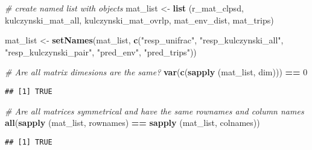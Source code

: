 \documentclass[]{article}
\newenvironment{Shaded}{\begin{snugshade}}{\end{snugshade}}
\newcommand{\KeywordTok}[1]{\textcolor[rgb]{0.13,0.29,0.53}{\textbf{#1}}}
\newcommand{\DataTypeTok}[1]{\textcolor[rgb]{0.13,0.29,0.53}{#1}}
\newcommand{\DecValTok}[1]{\textcolor[rgb]{0.00,0.00,0.81}{#1}}
\newcommand{\StringTok}[1]{\textcolor[rgb]{0.31,0.60,0.02}{#1}}
\newcommand{\CommentTok}[1]{\textcolor[rgb]{0.56,0.35,0.01}{\textit{#1}}}
\newcommand{\ControlFlowTok}[1]{\textcolor[rgb]{0.13,0.29,0.53}{\textbf{#1}}}
\newcommand{\OperatorTok}[1]{\textcolor[rgb]{0.81,0.36,0.00}{\textbf{#1}}}
\newcommand{\NormalTok}[1]{#1}
\begin{document}
\begin{Shaded}
\begin{Highlighting}[]
\CommentTok{# create named list with objects}
\NormalTok{mat_list <-}\StringTok{ }\KeywordTok{list}\NormalTok{ (r_mat_clpsd, kulczynski_mat_all, kulczynski_mat_ovrlp, }
\NormalTok{                   mat_env_dist, mat_trips) }

\NormalTok{mat_list <-}\StringTok{ }\KeywordTok{setNames}\NormalTok{(mat_list, }\KeywordTok{c}\NormalTok{(}\StringTok{"resp_unifrac"}\NormalTok{, }\StringTok{"resp_kulczynski_all"}\NormalTok{, }\StringTok{"resp_kulczynski_pair"}\NormalTok{, }
                     \StringTok{"pred_env"}\NormalTok{, }\StringTok{"pred_trips"}\NormalTok{))}

\CommentTok{# Are all matrix dimesions are the same?}
\KeywordTok{var}\NormalTok{(}\KeywordTok{c}\NormalTok{(}\KeywordTok{sapply}\NormalTok{ (mat_list, dim))) }\OperatorTok{==}\StringTok{ }\DecValTok{0}
\end{Highlighting}
\end{Shaded}

\begin{verbatim}
## [1] TRUE
\end{verbatim}

\begin{Shaded}
\begin{Highlighting}[]
\CommentTok{# Are all matrices symmetrical and have the same rownames and column names}
\KeywordTok{all}\NormalTok{(}\KeywordTok{sapply}\NormalTok{ (mat_list, rownames) }\OperatorTok{==}\StringTok{ }\KeywordTok{sapply}\NormalTok{ (mat_list, colnames))}
\end{Highlighting}
\end{Shaded}

\begin{verbatim}
## [1] TRUE
\end{verbatim}

\begin{Shaded}
\end{Shaded}
\end{document}
